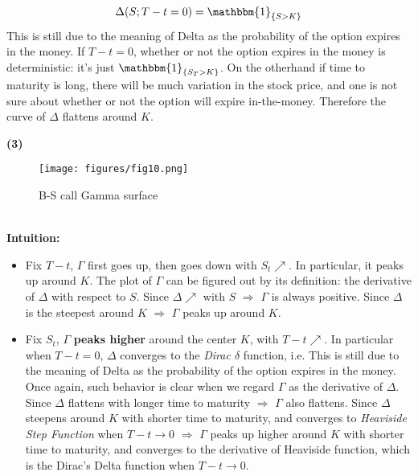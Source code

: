 \documentclass[10 pt]{hwtemplate} %
\begin{document}
\begin{solution}
\begin{itemize}
  $$
  \Delta(S; T-t=0) = \mathbbm{1}_{\{S>K\}}
  $$
  This is still due to the meaning of Delta as the probability of the option expires in the money. If $T-t=0$, whether or not the option expires in the money is deterministic: it's just $\mathbbm{1}_{\{S_T>K\}}$. On the otherhand if time to maturity is long, there will be much variation in the stock price, and one is not sure about whether or not the option will expire in-the-money. Therefore the curve of $\Delta$ flattens around $K$.
\end{itemize}
\textbf{(3)} 
\begin{figure}[H]
  \centering
  \captionsetup{justification=centering}
  \caption{B-S call Gamma surface}
  \texttt{[image: figures/fig10.png]}
\end{figure}
~\\
\textbf{Intuition:}
\begin{itemize}
  \item Fix $T-t$, $\Gamma$ first goes up, then goes down with $S_t \nearrow$. In particular, it peaks up around $K$. The plot of $\Gamma$ can be figured out by its definition: the derivative of $\Delta$ with respect to $S$. Since $\Delta \nearrow$ with $S$ $\Rightarrow$ $\Gamma$ is always positive. Since $\Delta$ is the steepest around $K$ $\Rightarrow$ $\Gamma$ peaks up around $K$.
  \item Fix $S_t$, $\Gamma$ \textbf{peaks higher} around the center $K$, with $T-t \nearrow$. In particular when $T-t=0$, $\Delta$ converges to the \textit{Dirac $\delta$} function, i.e.
  This is still due to the meaning of Delta as the probability of the option expires in the money. Once again, such behavior is clear when we regard $\Gamma$ as the derivative of $\Delta$. Since $\Delta$ flattens with longer time to maturity $\Rightarrow$ $\Gamma$ also flattens. Since $\Delta$ steepens around $K$ with shorter time to maturity, and converges to \textit{Heaviside Step Function} when $T-t\to0$ $\Rightarrow$ $\Gamma$ peaks up higher around $K$ with shorter time to maturity, and converges to the derivative of Heaviside function, which is the Dirac's Delta function when $T-t\to 0$.
\end{itemize}

\end{solution}
\end{document}
